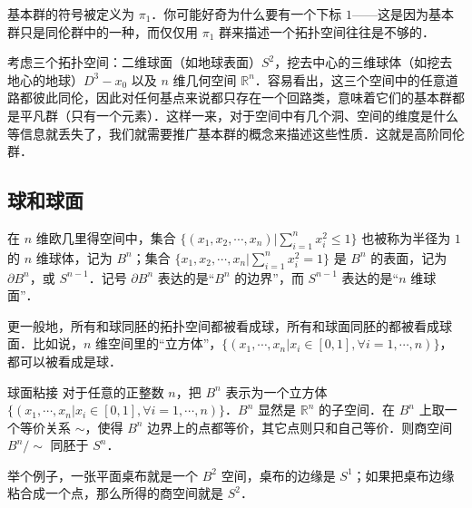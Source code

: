 
\begin{issues}
\issueDraft
\end{issues}





基本群的符号被定义为 $\pi_1$．你可能好奇为什么要有一个下标 $1$——这是因为基本群只是同伦群中的一种，而仅仅用 $\pi_1$ 群来描述一个拓扑空间往往是不够的．

考虑三个拓扑空间：二维球面（如地球表面）$S^2$，挖去中心的三维球体（如挖去地心的地球）$D^3-x_0$ 以及 $n$ 维几何空间 $\mathbb{R}^n$．容易看出，这三个空间中的任意道路都彼此同伦，因此对任何基点来说都只存在一个回路类，意味着它们的基本群都是平凡群（只有一个元素）．这样一来，对于空间中有几个洞、空间的维度是什么等信息就丢失了，我们就需要推广基本群的概念来描述这些性质．这就是高阶同伦群．

\subsection{球和球面}
在 $n$ 维欧几里得空间中，集合 $\{(x_1, x_2,\cdots,x_n)|\sum^n_{i=1}x_i^2\leq 1\}$ 也被称为半径为 $1$ 的 $n$ 维球体，记为 $B^n$；集合 $\{x_1, x_2, \cdots, x_n|\sum^n_{i=1}x_i^2=1\}$ 是 $B^n$ 的表面，记为 $\partial B^n$，或 $S^{n-1}$．记号 $\partial B^n$ 表达的是“$B^n$ 的边界”，而 $S^{n-1}$ 表达的是“$n$ 维球面”．

更一般地，所有和球同胚的拓扑空间都被看成球，所有和球面同胚的都被看成球面．比如说，$n$ 维空间里的“立方体”，$\{(x_1, \cdots, x_n|x_i\in[0, 1], \forall i=1, \cdots, n)\}$，都可以被看成是球．

\begin{theorem}{球面粘接}
对于任意的正整数 $n$，把 $B^n$ 表示为一个立方体 $\{(x_1, \cdots, x_n|x_i\in[0, 1], \forall i=1, \cdots, n)\}$．$B^n$ 显然是 $\mathbb{R}^n$ 的子空间．在 $B^n$ 上取一个等价关系 $\sim$，使得 $B^n$ 边界上的点都等价，其它点则只和自己等价．则商空间 $B^n/\sim$ 同胚于 $S^n$．
\end{theorem}

举个例子，一张平面桌布就是一个 $B^2$ 空间，桌布的边缘是 $S^1$；如果把桌布边缘粘合成一个点，那么所得的商空间就是 $S^2$．


